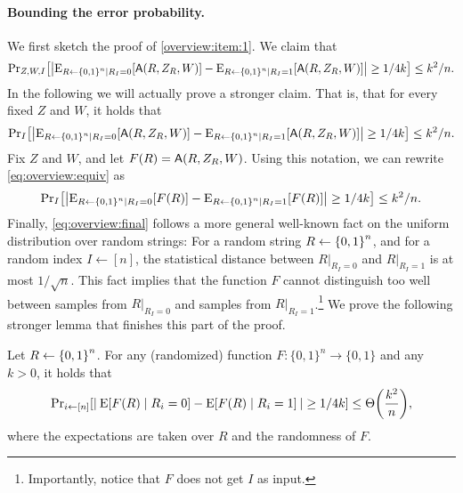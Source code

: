 \paragraph{Bounding the error probability.} We first sketch the proof of \cref{overview:item:1}. We claim that 
\begin{align}\label{eq:overview:side}
    \ppr{Z,W,I}{ \size{\eex{R\gets \zn\mid R_I=0}{\Ac(R,Z_R,W)}-\eex{R\gets \zn\mid R_I=1}{\Ac(R,Z_R,W)}}\ge 1/4k}\le k^2/n.
\end{align}
In the following we will actually prove a stronger claim. That is, that for every fixed $Z$ and $W$, it holds that 
\begin{align}\label{eq:overview:equiv}
    \ppr{I}{ \size{\eex{R\gets \zn\mid R_I=0}{\Ac(R,Z_R,W)}-\eex{R\gets \zn\mid R_I=1}{\Ac(R,Z_R,W)}}\ge 1/4k}\le k^2/n.
\end{align}
Fix $Z$ and $W$, and let $F(R)=\mathsf{A}(R,Z_R,W)$. Using this notation, we can rewrite \cref{eq:overview:equiv} as
\begin{align}\label{eq:overview:final}
    \ppr{I}{ \size{\eex{R\gets \zn\mid R_I=0}{F(R)}-\eex{R\gets \zn\mid R_I=1}{F(R)}}\ge 1/4k}\le k^2/n.
\end{align}
Finally, \cref{eq:overview:final} follows a more general well-known fact on the uniform distribution over random strings: For a random string $R\gets \zn$, and for a random index $I\gets [n]$, the statistical distance between $R|_{R_I=0}$ and $R|_{R_I=1}$ is at most $1/\sqrt{n}$. This  fact implies that the function $F$ cannot distinguish too well between  samples from $R|_{R_I=0}$ and samples from $R|_{R_I=1}$.\footnote{Importantly, notice that $F$ does not get $I$ as input.} We prove the following stronger lemma that finishes this part of the proof.

\begin{lemma}
        Let $R \la \zo^n$. 
	For any (randomized) function $F:\{0,1\}^n\rightarrow \{0,1\}$ and any $k>0$, it holds that
        \begin{align}\label{eq:f-alpha}
            \ppr{i \la [n]}{\size{\:\ex{F(R) \mid R_i = 0}-\ex{F(R) \mid R_i = 1}\:}\geq 1/4k} \leq \Theta\paren{\frac{k^2}{n}},
        \end{align}
        where the expectations are taken over $R$ and the randomness of $F$.
\end{lemma}


